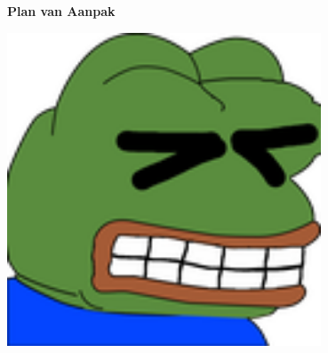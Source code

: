 \begin{titlepage}
   \begin{center}
       \vspace*{1cm}

		\Huge
		\textbf{Plan van Aanpak}

		\vspace{0.5cm}
	
		\LARGE
		\ProjectName
            
		\vspace{1.5cm}

		\textbf{\StudentName}

		\vspace{3.0cm}
		
		\includegraphics[width=0.7\textwidth]{img/DocumentHeader.png}
   \end{center}
\end{titlepage}
